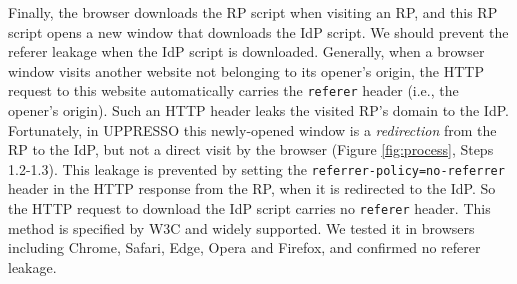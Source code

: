 Finally,
    the browser downloads the RP script when visiting an RP,
     and this RP script opens a new window that downloads the IdP script.
We should prevent the referer leakage when the IdP script is downloaded.
Generally, when a browser window visits another website not belonging to its opener's origin,
 the HTTP request to this website automatically carries the \verb+referer+ header (i.e., the opener's origin).
Such an HTTP header leaks the visited RP's domain to the IdP.
Fortunately, in UPPRESSO this newly-opened window is a \emph{redirection} from the RP to the IdP,
 but not a direct visit by the browser (Figure \ref{fig:process}, Steps 1.2-1.3).
This leakage is prevented by setting the \verb+referrer-policy=no-referrer+ header in the HTTP response from the RP, when it is redirected to the IdP.
So the HTTP request to download the IdP script carries no \verb+referer+ header.
This method is specified by W3C \cite{referer_policy} and widely supported.
We tested it in browsers including Chrome, Safari, Edge, Opera and Firefox, and confirmed no referer leakage.















